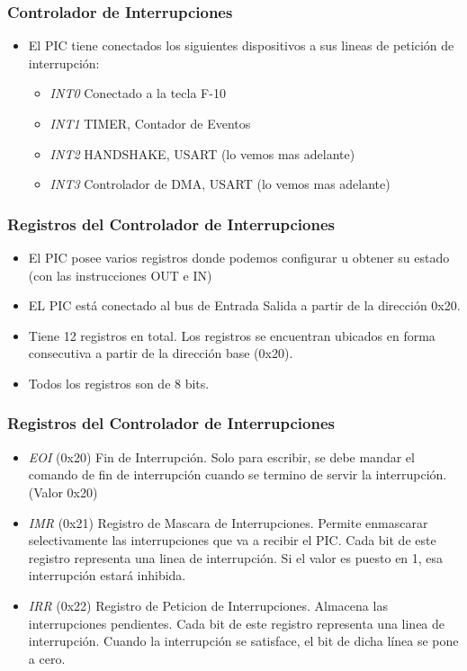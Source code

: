 \documentclass{beamer}
\begin{document}
\begin{frame}
\frametitle{Controlador de Interrupciones}

\begin{itemize}
 \item El PIC tiene conectados los siguientes dispositivos a sus lineas de petición de interrupción:
 \begin{itemize}
  \item \emph{INT0} Conectado a la tecla F-10
  \item \emph{INT1} TIMER, Contador de Eventos
  \item \emph{INT2} HANDSHAKE, USART (lo vemos mas adelante)
  \item \emph{INT3} Controlador de DMA, USART (lo vemos mas adelante)
 \end{itemize}
\end{itemize}

\end{frame}


\begin{frame}
\frametitle{Registros del Controlador de Interrupciones}

\begin{itemize}
 \item El PIC posee varios registros donde podemos configurar u obtener su estado (con las instrucciones OUT e IN)
 \item EL PIC está conectado al bus de Entrada Salida a partir de la dirección 0x20.
 \item Tiene 12 registros en total. Los registros se encuentran ubicados en forma consecutiva a partir de la dirección base (0x20).
 \item Todos los registros son de 8 bits.
\end{itemize}
\end{frame}

\begin{frame}
\frametitle{Registros del Controlador de Interrupciones}

\begin{itemize}
 \item \emph{EOI} (0x20) Fin de Interrupción. Solo para escribir, se debe mandar el comando de fin de interrupción cuando se termino de servir la interrupción. (Valor 0x20)
 \item \emph{IMR} (0x21) Registro de Mascara de Interrupciones. Permite enmascarar selectivamente las interrupciones que va a recibir el PIC. Cada bit de este registro representa una linea de interrupción. Si el valor es puesto en 1, esa interrupción estará inhibida.
 \item \emph{IRR} (0x22) Registro de Peticion de Interrupciones. Almacena las interrupciones pendientes. Cada bit de este registro representa una linea de interrupción. Cuando la interrupción se satisface, el bit de dicha línea se pone a cero.
\end{itemize}

\end{frame}
\end{document}
